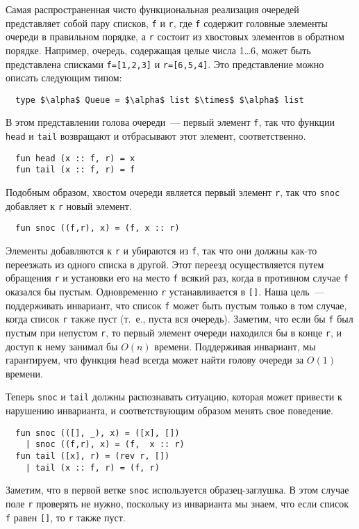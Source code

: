 Самая распространенная чисто функциональная реализация очередей
представляет собой пару списков, \lstinline!f! и \lstinline!r!, где
\lstinline!f! содержит головные элементы очереди в правильном порядке,
а \lstinline!r! состоит из хвостовых элементов в обратном порядке.
Например, очередь, содержащая целые числа 1\ldots 6, может быть
представлена списками \lstinline!f=[1,2,3]! и
\lstinline!r=[6,5,4]!. Это представление можно описать следующим
типом:
\begin{lstlisting}
  type $\alpha$ Queue = $\alpha$ list $\times$ $\alpha$ list
\end{lstlisting}
В этом представлении голова очереди~--- первый элемент \lstinline!f!,
так что функции \lstinline!head! и \lstinline!tail!
возвращают и отбрасывают этот элемент, соответственно.
\begin{lstlisting}
  fun head (x :: f, r) = x
  fun tail (x :: f, r) = f
\end{lstlisting}
Подобным образом, хвостом очереди является первый элемент
\lstinline!r!, так что \lstinline!snoc! добавляет к \lstinline!r!
новый элемент.
\begin{lstlisting}
  fun snoc ((f,r), x) = (f, x :: r)
\end{lstlisting}
Элементы добавляются к \lstinline!r! и убираются из \lstinline!f!, так
что они должны как-то переезжать из одного списка в другой. Этот
переезд осуществляется путем обращения \lstinline!r! и установки его
на место \lstinline!f! всякий раз, когда в противном случае
\lstinline!f! оказался бы пустым. Одновременно \lstinline!r!
устанавливается в \lstinline![]!. Наша цель~--- поддерживать
инвариант, что список \lstinline!f! может быть пустым только в том
случае, когда список \lstinline!r! также пуст (т.~е., пуста вся
очередь). Заметим, что если бы \lstinline!f! был пустым при непустом
\lstinline!r!, то первый элемент очереди находился бы в конце
\lstinline!r!, и доступ к нему занимал бы $O(n)$ времени. Поддерживая
инвариант, мы гарантируем, что функция \lstinline!head! всегда может
найти голову очереди за $O(1)$ времени.

Теперь \lstinline!snoc! и \lstinline!tail! должны распознавать
ситуацию, которая может привести к нарушению инварианта, и
соответствующим образом менять свое поведение.
\begin{lstlisting}
  fun snoc (([], _), x) = ([x], [])
    | snoc ((f,r), x) = (f,  x :: r)
  fun tail ([x], r) = (rev r, [])
    | tail (x :: f, r) = (f, r)
\end{lstlisting}
Заметим, что в первой ветке \lstinline!snoc! используется
образец-заглушка. В этом случае поле \lstinline!r! проверять не нужно,
поскольку из инварианта мы знаем, что если список \lstinline!f! равен
\lstinline![]!, то \lstinline!r! также пуст.

